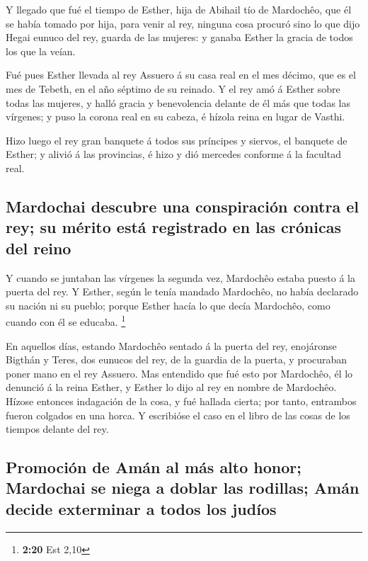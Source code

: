  Y llegado que fué el tiempo de Esther, hija de Abihail tío
de Mardochêo, que él se había tomado por hija, para venir al rey,
ninguna cosa procuró sino lo que dijo Hegai eunuco del rey, guarda de
las mujeres: y ganaba Esther la gracia de todos los que la veían.

 Fué pues Esther llevada al rey Assuero á su casa real en
el mes décimo, que es el mes de Tebeth, en el año séptimo de su reinado.
 Y el rey amó á Esther sobre todas las mujeres, y halló
gracia y benevolencia delante de él más que todas las vírgenes; y puso
la corona real en su cabeza, é hízola reina en lugar de Vasthi.

 Hizo luego el rey gran banquete á todos sus príncipes y
siervos, el banquete de Esther; y alivió á las provincias, é hizo y dió
mercedes conforme á la facultad real.

\hypertarget{mardochai-descubre-una-conspiraciuxf3n-contra-el-rey-su-muxe9rito-estuxe1-registrado-en-las-cruxf3nicas-del-reino}{%
\subsection{Mardochai descubre una conspiración contra el rey; su mérito
está registrado en las crónicas del
reino}\label{mardochai-descubre-una-conspiraciuxf3n-contra-el-rey-su-muxe9rito-estuxe1-registrado-en-las-cruxf3nicas-del-reino}}

 Y cuando se juntaban las vírgenes la segunda vez,
Mardochêo estaba puesto á la puerta del rey.  Y Esther,
según le tenía mandado Mardochêo, no había declarado su nación ni su
pueblo; porque Esther hacía lo que decía Mardochêo, como cuando con él
se educaba. \footnote{\textbf{2:20} Est 2,10}

 En aquellos días, estando Mardochêo sentado á la puerta
del rey, enojáronse Bigthán y Teres, dos eunucos del rey, de la guardia
de la puerta, y procuraban poner mano en el rey Assuero. 
Mas entendido que fué esto por Mardochêo, él lo denunció á la reina
Esther, y Esther lo dijo al rey en nombre de Mardochêo. 
Hízose entonces indagación de la cosa, y fué hallada cierta; por tanto,
entrambos fueron colgados en una horca. Y escribióse el caso en el libro
de las cosas de los tiempos delante del rey.

\hypertarget{promociuxf3n-de-amuxe1n-al-muxe1s-alto-honor-mardochai-se-niega-a-doblar-las-rodillas-amuxe1n-decide-exterminar-a-todos-los-juduxedos}{%
\subsection{Promoción de Amán al más alto honor; Mardochai se niega a
doblar las rodillas; Amán decide exterminar a todos los
judíos}\label{promociuxf3n-de-amuxe1n-al-muxe1s-alto-honor-mardochai-se-niega-a-doblar-las-rodillas-amuxe1n-decide-exterminar-a-todos-los-juduxedos}}

